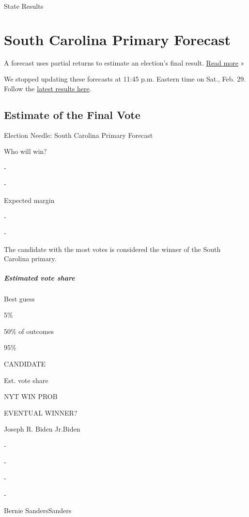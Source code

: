  State Results

\hypertarget{south-carolina-primary-forecast-1}{%
\section{South Carolina Primary
Forecast}\label{south-carolina-primary-forecast-1}}

A forecast uses partial returns to estimate an election's final result.
\href{https://www.nytimes3xbfgragh.onion/2020/02/11/upshot/needle-election-new-hampshire.html}{Read
more} »

We stopped updating these forecasts at 11:45 p.m. Eastern time on Sat.,
Feb. 29. Follow the
\href{https://www.nytimes3xbfgragh.onion/interactive/2020/02/29/us/elections/results-south-carolina-primary-election.html?action=click\&module=ELEX_results\&pgtype=Interactive\&region=Navigation}{latest
results here}.

\hypertarget{estimate-of-the-final-vote}{%
\subsection{Estimate of the Final
Vote}\label{estimate-of-the-final-vote}}

Election Needle: South Carolina Primary Forecast

Who will win?

-

-

Expected margin

-

-

The candidate with the most votes is considered the winner of the South
Carolina primary.

\hypertarget{estimated-vote-share}{%
\subparagraph{Estimated vote share}\label{estimated-vote-share}}

Best guess

5\%

50\% of outcomes

95\%

CANDIDATE

Est. vote share

NYT WIN PROB

EVENTUAL WINNER?

Joseph R. Biden Jr.Biden

-

-

-

-

Bernie SandersSanders

